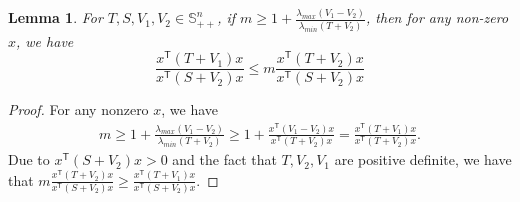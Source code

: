 \documentclass[letterpaper, 10 pt, conference]{ieeeconf}  %
\newcommand{\transpose}{\mathsf{T}}
\newcommand{\quadinner}[1]{x^{\transpose}(#1)x}
\newtheorem{lemma}{Lemma}
\begin{document}
\begin{lemma}\label{lemma:m}
    For $T,S,V_{1},V_{2}\in \mathbb{S}_{++}^{n}$, if
$       m \geq 1+\frac{\lambda_{max}(V_{1}-V_{2})}{\lambda_{min}(T+V_{2})}$,
    then for any non-zero $x$, we have
    \begin{equation}
        \frac{\quadinner{T+V_{1}}}{\quadinner{S+V_{2}}} \leq m\frac{\quadinner{T+V_{2}}}{\quadinner{S+V_{2}}}
    \end{equation}
\end{lemma}
\begin{proof}
    For any nonzero $x$, we have
    \begin{align*}
        m \geq 1+\frac{\lambda_{max}(V_{1}-V_{2})}{\lambda_{min}(T+V_{2})}
        \geq 1+ \frac{\quadinner{V_{1}-V_{2}}}{\quadinner{T+V_{2}}}
        = \frac{\quadinner{T+V_{1}}}{\quadinner{T+V_{2}}}.
     \end{align*}
     Due to $\quadinner{S+V_{2}} > 0$ and the fact that $T,V_{2},V_{1}$ are positive definite, we have that 
         $m\frac{\quadinner{T+V_{2}}}{\quadinner{S+V_{2}}} \geq \frac{\quadinner{T+V_{1}}}{\quadinner{S+V_{2}}}$.
\end{proof}



\end{document}
